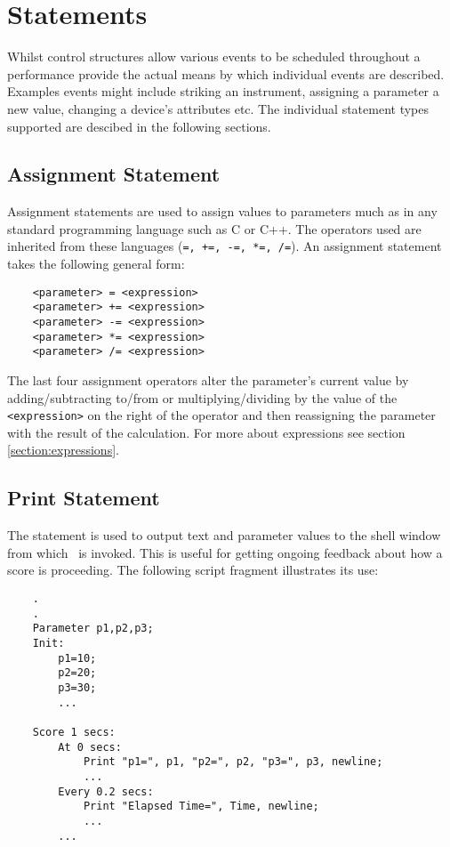 \section{Statements}
\label{section:statements}
Whilst control structures allow various events to be scheduled throughout
a performance  provide the actual means by which individual
events are described. Examples events might include striking an instrument,
assigning a parameter a new value, changing a device's attributes etc. 
The individual statement types supported are descibed in the following
sections.

\subsection{Assignment Statement}
\label{section:assignment_statement}
Assignment statements are used to assign values to parameters much as
in any standard programming language such as C or C++. The operators
used are inherited from these languages (\verb|=, +=, -=, *=, /=|).
An assignment statement takes the following general form:

\begin{verbatim}
    <parameter> = <expression>
    <parameter> += <expression>
    <parameter> -= <expression>
    <parameter> *= <expression>
    <parameter> /= <expression>
\end{verbatim}

The last four assignment operators alter the parameter's current
value by adding/subtracting to/from or multiplying/dividing by the value
of the \verb|<expression>| on the right of the operator and then reassigning
the parameter with the result of the calculation. For more about expressions
see section \ref{section:expressions}.

\subsection{Print Statement}
\label{section:print_statement}
The  statement is used to output text and parameter values to
the shell window from which \tao\ is invoked. This is useful for
getting ongoing feedback about how a score is proceeding. The following
script fragment illustrates its use:

\begin{verbatim}
    .
    .
    Parameter p1,p2,p3;
    Init:
        p1=10;
        p2=20;
        p3=30;
        ...
    
    Score 1 secs:
        At 0 secs:
            Print "p1=", p1, "p2=", p2, "p3=", p3, newline;
            ...
        Every 0.2 secs:
            Print "Elapsed Time=", Time, newline;
            ...
        ...
\end{verbatim}

